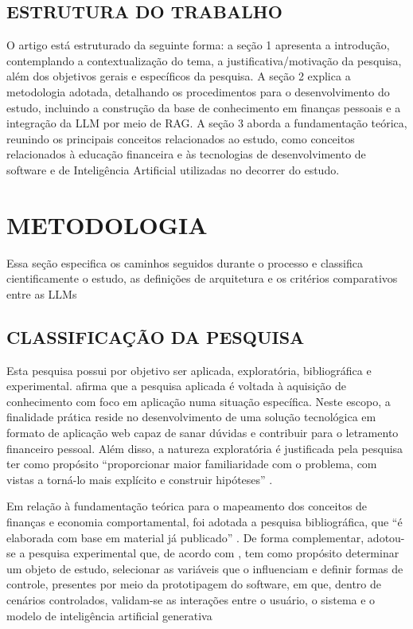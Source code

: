 \documentclass[12pt]{article}
\begin{document}
\subsection{ESTRUTURA DO TRABALHO}

  O artigo está estruturado da seguinte forma: a seção 1 apresenta a introdução, contemplando a contextualização do tema, a justificativa/motivação da pesquisa, além dos objetivos gerais e específicos da pesquisa. A seção 2 explica a metodologia adotada, detalhando os procedimentos para o desenvolvimento do estudo, incluindo a construção da base de conhecimento em finanças pessoais e a integração da LLM por meio de RAG. A seção 3 aborda a fundamentação teórica, reunindo os principais conceitos relacionados ao estudo, como conceitos relacionados à educação financeira e às tecnologias de desenvolvimento de software e de Inteligência Artificial utilizadas no decorrer do estudo.



\section{METODOLOGIA} \label{sec:metodologia}

  Essa seção especifica os caminhos seguidos durante o processo e classifica cientificamente o estudo, as definições de arquitetura e os critérios comparativos entre as LLMs

  \subsection{CLASSIFICAÇÃO DA PESQUISA}

    Esta pesquisa possui por objetivo ser aplicada, exploratória, bibliográfica e experimental. \cite{gil2022projetos} afirma que a pesquisa aplicada é voltada à aquisição de conhecimento com foco em aplicação numa situação específica. Neste escopo, a finalidade prática reside no desenvolvimento de uma solução tecnológica em formato de aplicação web capaz de sanar dúvidas e contribuir para o letramento financeiro pessoal. Além disso, a natureza exploratória é justificada pela pesquisa ter como propósito “proporcionar maior familiaridade com o problema, com vistas a torná-lo mais explícito e construir hipóteses” \cite{gil2022projetos}.

    Em relação à fundamentação teórica para o mapeamento dos conceitos de finanças e economia comportamental, foi adotada a pesquisa bibliográfica, que “é elaborada com base em material já publicado” \cite{gil2022projetos}. De forma complementar, adotou-se a pesquisa experimental que, de acordo com \cite{gil2022projetos}, tem como propósito determinar um objeto de estudo, selecionar as variáveis que o influenciam e definir formas de controle, presentes por meio da prototipagem do software, em que, dentro de cenários controlados, validam-se as interações entre o usuário, o sistema e o modelo de inteligência artificial generativa
\end{document}
